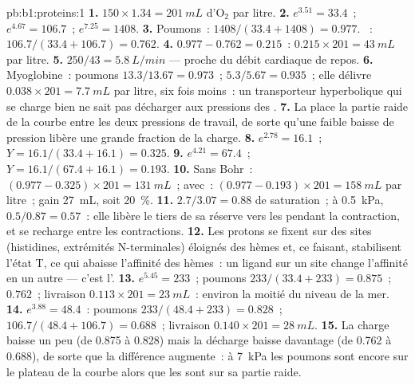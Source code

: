 \begin{solution}{pb:b1:proteins:1}
\textbf{1.} $150\times 1.34 = \qty{201}{mL}$ d'$\mathrm{O_2}$ par litre.
\textbf{2.} $e^{3.51} = 33.4$~; $e^{4.67} = 106.7$~; $e^{7.25} = 1408$.
\textbf{3.} Poumons~: $1408/(33.4 + 1408) = 0.977$. ~:
$106.7/(33.4 + 106.7) = 0.762$.
\textbf{4.} $0.977 - 0.762 = 0.215$~: $0.215\times 201 = \qty{43}{mL}$
par litre.
\textbf{5.} $250/43 = \qty{5.8}{L/min}$ --- proche du débit cardiaque
de repos.
\textbf{6.} Myoglobine~: poumons $13.3/13.67 = 0.973$~; 
$5.3/5.67 = 0.935$~; elle délivre $0.038\times 201 = \qty{7.7}{mL}$ par
litre, six fois moins~: un transporteur hyperbolique qui se charge bien
ne sait pas décharger aux pressions des .
\textbf{7.} La  place la partie raide de la courbe entre
les deux pressions de travail, de sorte qu'une faible baisse de pression
libère une grande fraction de la charge.
\textbf{8.} $e^{2.78} = 16.1$~; $Y = 16.1/(33.4 + 16.1) = 0.325$.
\textbf{9.} $e^{4.21} = 67.4$~; $Y = 16.1/(67.4 + 16.1) = 0.193$.
\textbf{10.} Sans Bohr~: $(0.977 - 0.325)\times 201 = \qty{131}{mL}$~;
avec~: $(0.977 - 0.193)\times 201 = \qty{158}{mL}$ par litre~; gain
\qty{27}{mL}, soit \qty{20}{\%}.
\textbf{11.} $2.7/3.07 = 0.88$ de saturation~; à \qty{0.5}{kPa},
$0.5/0.87 = 0.57$~: elle libère le tiers de sa réserve vers les
 pendant la contraction, et se recharge entre les
contractions.
\textbf{12.} Les protons se fixent sur des sites (histidines, extrémités
N-terminales) éloignés des hèmes et, ce faisant, stabilisent l'état T,
ce qui abaisse l'affinité des hèmes~: un ligand sur un site change
l'affinité en un autre --- c'est l'.
\textbf{13.} $e^{5.45} = 233$~; poumons $233/(33.4 + 233) = 0.875$~;
 $0.762$~; livraison $0.113\times 201 = \qty{23}{mL}$~: environ la
moitié du niveau de la mer.
\textbf{14.} $e^{3.88} = 48.4$~: poumons $233/(48.4 + 233) = 0.828$~;
 $106.7/(48.4 + 106.7) = 0.688$~; livraison $0.140\times 201 =
\qty{28}{mL}$.
\textbf{15.} La charge baisse un peu (de 0.875 à 0.828) mais la décharge
baisse davantage (de 0.762 à 0.688), de sorte que la différence
augmente~: à \qty{7}{kPa} les poumons sont encore sur le plateau de la
courbe alors que les  sont sur sa partie raide.

\end{solution}
